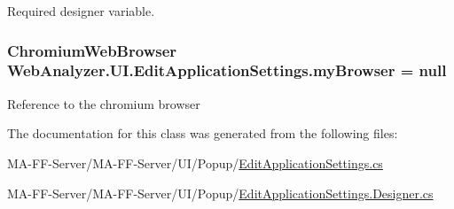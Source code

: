 Required designer variable. 

\hypertarget{class_web_analyzer_1_1_u_i_1_1_edit_application_settings_a13a4f8fb22ec5f36f5824f489231ed85}{}
\subsubsection[{my\+Browser}]{\setlength{\rightskip}{0pt plus 5cm}Chromium\+Web\+Browser Web\+Analyzer.\+U\+I.\+Edit\+Application\+Settings.\+my\+Browser = null\hspace{0.3cm}{\ttfamily [private]}}\label{class_web_analyzer_1_1_u_i_1_1_edit_application_settings_a13a4f8fb22ec5f36f5824f489231ed85}


Reference to the chromium browser 



The documentation for this class was generated from the following files\+:\begin{DoxyCompactItemize}
\item 
M\+A-\/\+F\+F-\/\+Server/\+M\+A-\/\+F\+F-\/\+Server/\+U\+I/\+Popup/\hyperlink{_edit_application_settings_8cs}{Edit\+Application\+Settings.\+cs}\item 
M\+A-\/\+F\+F-\/\+Server/\+M\+A-\/\+F\+F-\/\+Server/\+U\+I/\+Popup/\hyperlink{_edit_application_settings_8_designer_8cs}{Edit\+Application\+Settings.\+Designer.\+cs}\end{DoxyCompactItemize}
